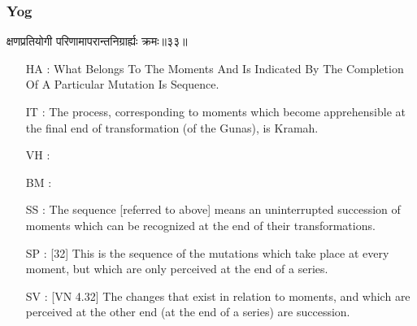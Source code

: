 \begin{frame}[fragile]\frametitle{Yog}
\begin{sanskrit}
क्षणप्रतियोगी परिणामापरान्तनिग्रार्ह्यः क्रमः॥३३॥
\end{sanskrit}

	\begin{itemize}
	\item [HA]: What Belongs To The Moments And Is Indicated By The Completion Of A Particular Mutation Is Sequence.
	\item [IT]: The process, corresponding to moments which become apprehensible at the final end of transformation (of the Gunas), is Kramah.
	\item [VH]: 
	\item [BM]: 
	\item [SS]: The sequence [referred to above] means an uninterrupted succession of moments which can be recognized at the end of their transformations.
	\item [SP]: [32] This is the sequence of the mutations which take place at every moment, but which are only perceived at the end of a series.
	\item [SV]: [VN 4.32] The changes that exist in relation to moments, and which are perceived at the other end (at the end of a series) are succession. 
	\end{itemize}
\end{frame}

